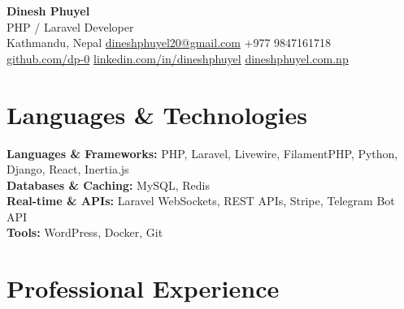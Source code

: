 \documentclass[10pt, a4paper]{article}
\begin{document}
\pagestyle{empty}

\begin{center}
    {\Huge\bfseries Dinesh Phuyel} \\[4pt]
    {\large PHP / Laravel Developer} \\[5pt]
    Kathmandu, Nepal
    \enspace\textbar\enspace
    \href{mailto:dineshphuyel20@gmail.com}{dineshphuyel20@gmail.com}
    \enspace\textbar\enspace
    +977 9847161718 \\[3pt]
    \href{https://github.com/dp-0}{github.com/dp-0}
    \enspace\textbar\enspace
    \href{https://linkedin.com/in/dineshphuyel}{linkedin.com/in/dineshphuyel}
    \enspace\textbar\enspace
    \href{https://dineshphuyel.com.np}{dineshphuyel.com.np}
\end{center}

\vspace{2pt}

\section{Languages \& Technologies}

\noindent
\textbf{Languages \& Frameworks:} PHP, Laravel, Livewire, FilamentPHP, Python, Django, React, Inertia.js \\
\textbf{Databases \& Caching:} MySQL, Redis \\
\textbf{Real-time \& APIs:} Laravel WebSockets, REST APIs, Stripe, Telegram Bot API \\
\textbf{Tools:} WordPress, Docker, Git

\section{Professional Experience}
\end{document}
